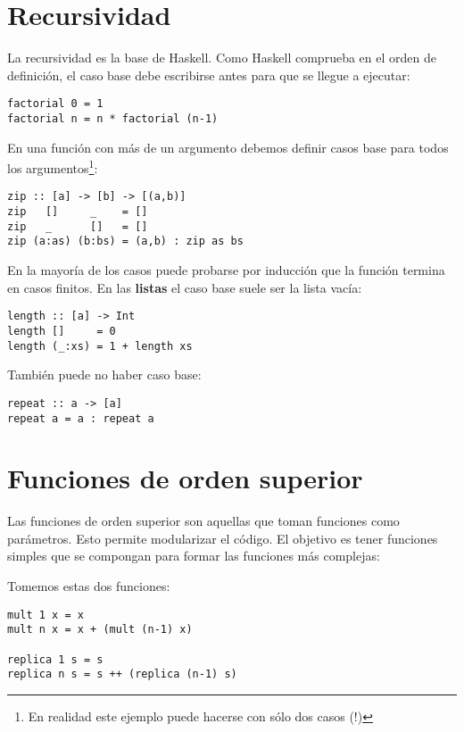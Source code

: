 \section{Recursividad}

La recursividad es la base de Haskell. Como Haskell comprueba en el orden de
definición, el caso base debe escribirse antes para que se llegue a ejecutar:

\begin{lstlisting}
factorial 0 = 1
factorial n = n * factorial (n-1)
\end{lstlisting}

En una función con más de un argumento debemos definir casos base para todos los
argumentos\footnote{En realidad este ejemplo puede hacerse con sólo dos casos (!)}:

\begin{lstlisting}
zip :: [a] -> [b] -> [(a,b)]
zip   []     _    = []
zip   _      []   = []
zip (a:as) (b:bs) = (a,b) : zip as bs
\end{lstlisting}

En la mayoría de los casos puede probarse por inducción que la función termina
en casos finitos. En las \textbf{listas} el caso base suele ser la lista vacía:

\begin{lstlisting}
length :: [a] -> Int
length []     = 0
length (_:xs) = 1 + length xs
\end{lstlisting}

También puede no haber caso base:

\begin{lstlisting}
repeat :: a -> [a]
repeat a = a : repeat a
\end{lstlisting}

\section{Funciones de orden superior}
Las funciones de orden superior son aquellas que toman funciones como parámetros.
Esto permite modularizar el código. El objetivo es tener funciones simples
que se compongan para formar las funciones más complejas:

Tomemos estas dos funciones:

\begin{lstlisting}
mult 1 x = x
mult n x = x + (mult (n-1) x)

replica 1 s = s
replica n s = s ++ (replica (n-1) s)
\end{lstlisting}

